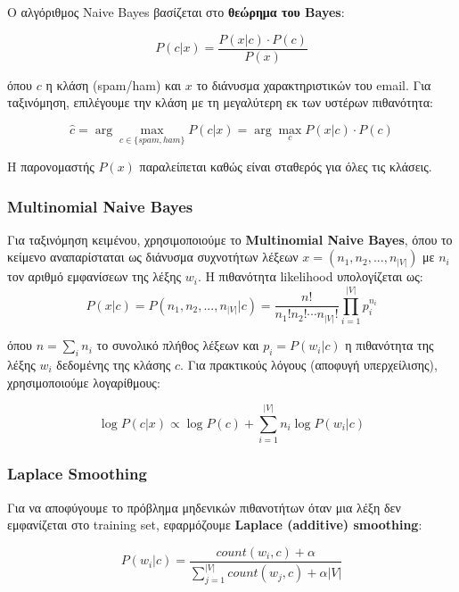 \documentclass[12pt,a4paper,twoside]{book}
\begin{document}
Ο αλγόριθμος Naive Bayes βασίζεται στο \textbf{θεώρημα του Bayes}:

\begin{equation}
    P(c|x) = \frac{P(x|c) \cdot P(c)}{P(x)}
\end{equation}

όπου \(c\) η κλάση (spam/ham) και \(x\) το διάνυσμα χαρακτηριστικών του email. Για ταξινόμηση, επιλέγουμε την κλάση με τη μεγαλύτερη εκ των υστέρων πιθανότητα:

\begin{equation}
    \hat{c} = \arg\max_{c \in \{spam, ham\}} P(c|x) = \arg\max_{c} P(x|c) \cdot P(c)
\end{equation}

Η παρονομαστής \(P(x)\) παραλείπεται καθώς είναι σταθερός για όλες τις κλάσεις.

\subsubsection*{Multinomial Naive Bayes}

Για ταξινόμηση κειμένου, χρησιμοποιούμε το \textbf{Multinomial Naive Bayes}, όπου το κείμενο αναπαρίσταται ως διάνυσμα συχνοτήτων λέξεων \(x = (n_1, n_2, ..., n_{|V|})\) με \(n_i\) τον αριθμό εμφανίσεων της λέξης \(w_i\). Η πιθανότητα likelihood υπολογίζεται ως:
\begin{equation}
    P(x|c) = P(n_1, n_2, ..., n_{|V|}|c) = \frac{n!}{n_1! n_2! \cdots n_{|V|}!} \prod_{i=1}^{|V|} p_i^{n_i}
\end{equation}

όπου \(n = \sum_i n_i\) το συνολικό πλήθος λέξεων και \(p_i = P(w_i|c)\) η πιθανότητα της λέξης \(w_i\) δεδομένης της κλάσης \(c\). Για πρακτικούς λόγους (αποφυγή υπερχείλισης), χρησιμοποιούμε λογαρίθμους:

\begin{equation}
    \log P(c|x) \propto \log P(c) + \sum_{i=1}^{|V|} n_i \log P(w_i|c)
\end{equation}

\subsubsection*{Laplace Smoothing}

Για να αποφύγουμε το πρόβλημα μηδενικών πιθανοτήτων όταν μια λέξη δεν εμφανίζεται στο training set, εφαρμόζουμε \textbf{Laplace (additive) smoothing}:

\begin{equation}
    P(w_i|c) = \frac{count(w_i, c) + \alpha}{\sum_{j=1}^{|V|} count(w_j, c) + \alpha |V|}
\end{equation}
\end{document}
